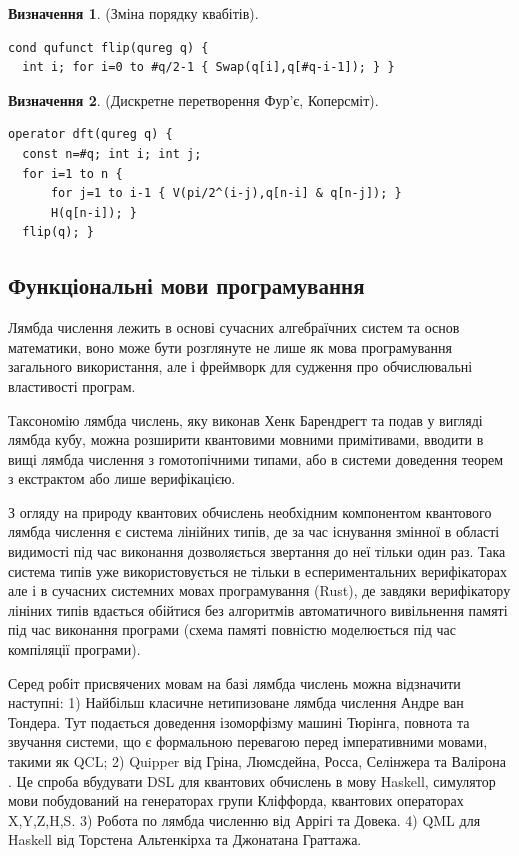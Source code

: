 \documentclass{article}
\theoremstyle{definition}
\newtheorem{definition}{Визначення}
\begin{document}
\begin{definition} (Зміна порядку квабітів).
\begin{lstlisting}
cond qufunct flip(qureg q) {
  int i; for i=0 to #q/2-1 { Swap(q[i],q[#q-i-1]); } }
\end{lstlisting}
\end{definition}

\begin{definition} (Дискретне перетворення Фур'є, Коперсміт).
\begin{lstlisting}
operator dft(qureg q) {
  const n=#q; int i; int j;
  for i=1 to n {
      for j=1 to i-1 { V(pi/2^(i-j),q[n-i] & q[n-j]); }
      H(q[n-i]); }
  flip(q); }
\end{lstlisting}
\end{definition}

\newpage
\subsection{Функціональні мови програмування}
Лямбда числення лежить в основі сучасних алгебраїчних систем та основ математики\cite{HoTT13},
воно може бути розглянуте не лише як мова програмування загального використання, але і
фреймворк для судження про обчислювальні властивості програм.

Таксономію лямбда числень, яку виконав Хенк Барендрегт та подав у вигляді лямбда кубу\cite{Henk93},
можна розширити квантовими мовними примітивами, вводити в вищі лямбда числення з
гомотопічними типами, або в системи доведення теорем з екстрактом або лише верифікацією.

З огляду на природу квантових обчислень необхідним компонентом квантового лямбда
числення є система лінійних типів, де за час існування змінної в області видимості
під час виконання дозволяється звертання до неї тільки один раз. Така система типів
уже використовується не тільки в еспериментальних верифікаторах але і в сучасних
системних мовах програмування (Rust), де завдяки верифікатору лініних типів
вдається обійтися без алгоритмів автоматичного вивільнення памяті під час
виконання програми (схема памяті повністю моделюється під час компіляції програми).

Серед робіт присвячених мовам на базі лямбда числень можна відзначити наступні:
1) Найбільш класичне нетипизоване лямбда числення Андре ван Тондера\cite{Tonder2004}.
   Тут подається доведення ізоморфізму машині Тюрінга, повнота та звучання системи,
   що є формальною перевагою перед імперативними мовами, такими як QCL;
2) Quipper від Гріна, Люмсдейна, Росса, Селінжера та Валірона \cite{Green2013}\cite{Green2013-2}.
   Це спроба вбудувати DSL для квантових обчислень в мову Haskell, симулятор
   мови побудований на генераторах групи Кліффорда, квантових операторах {X,Y,Z,H,S}.
3) Робота по лямбда численню від Аррігі та Довека\cite{Arrighi2004}.
4) QML для Haskell від Торстена Альтенкірха
   та Джонатана Граттажа\cite{Altenkirch2005}\cite{Altenkirch2007}\cite{Grattage2011}.
\end{document}
